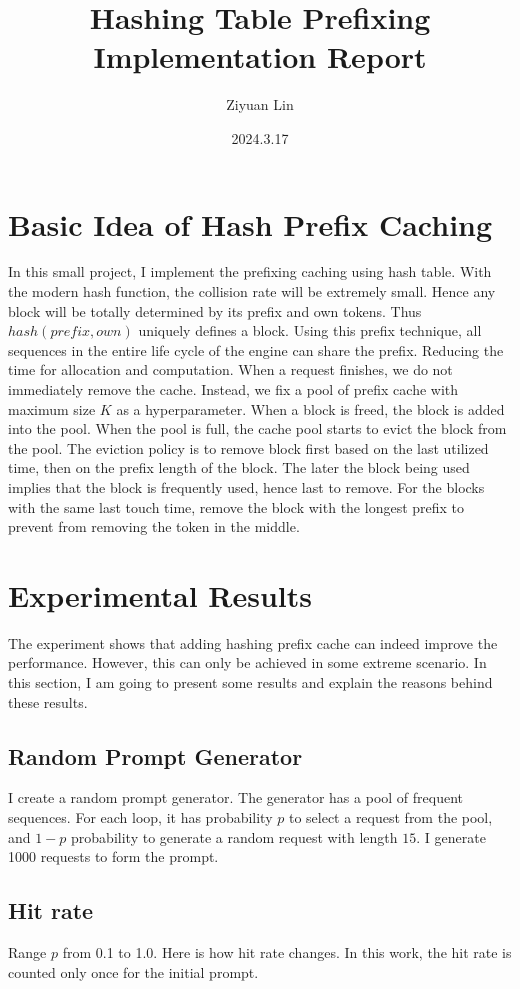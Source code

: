 \documentclass{article}
\title{Hashing Table Prefixing Implementation Report}
\author{Ziyuan Lin}
\date{2024.3.17}
\begin{document}
\maketitle

\section{Basic Idea of Hash Prefix Caching}
In this small project, I implement the prefixing caching using hash table. With the modern hash function, the collision rate will be extremely small.
Hence any block will be totally determined by its prefix and own tokens. Thus \\ $hash(prefix, own)$ uniquely defines a block. Using this prefix technique, all sequences in the entire life cycle of the engine can share the prefix.
Reducing the time for allocation and computation. When a request finishes, we do not immediately remove the cache. Instead, we fix a pool of prefix cache with maximum size $K$ as a hyperparameter. When a block is freed, the block is added into the
pool. When the pool is full, the cache pool starts to evict the block from the pool. The eviction policy is to remove block first based on the last utilized time, then on the prefix length of the block. The later the block being used implies that the block 
is frequently used, hence last to remove. For the blocks with the same last touch time, remove the block with the longest prefix to prevent from removing the token in the middle. 

\section{Experimental Results}
The experiment shows that adding hashing prefix cache can indeed improve the performance. However, this can only be achieved in some extreme scenario. In this section, I am going to present some results and explain the reasons behind these results.
\subsection{Random Prompt Generator}
I create a random prompt generator. The generator has a pool of frequent sequences. For each loop, it has probability $p$ to select a request from the pool, and $1-p$ probability to generate a random request with length $15$.
I generate 1000 requests to form the prompt.
\\[8pt]
\subsection{Hit rate}
Range $p$ from 0.1 to 1.0. Here is how hit rate changes. In this work, the hit rate is counted only once for the initial prompt. 
\end{document}
